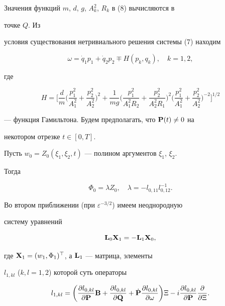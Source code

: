 Значения функций $m$, $d$, $g$, $A^2_k$, $R_k$ в (8) вычисляются в


точке $Q$. Из 


условия существования нетривиального решения системы (7) находим 


\begin{equation} 


\omega=\Dot q_1p_1+\Dot q_2p_2\mp H(p_k,q_k),\quad k=1,2, 


\end{equation} 


где 


$$ 


H=\biggl[\frac{d}{m}\biggl(\frac{p^2_1}{A^2_1}+ 


\frac{p^2_2}{A^2_2}\biggr)^2+\frac{1}{mg}\biggl( 


\frac{p^2_1}{A^2_1R_2}+\frac{p^2_2}{A^2_2R_1}\biggr)^2 


\biggl(\frac{p^2_1}{A^2_1}+\frac{p^2_2}{A^2_2}\biggr)^{-2} 


\biggr]^{1/2} 


$$ 


--- функция Гамильтона. Будем предполагать, что $\bold P(t)\ne 0$ на 


некотором отрезке $t\in[0,T]$. 


 


Пусть $w_0=Z_0(\xi_1,\xi_2,t)$ --- полином аргументов $\xi_1$, $\xi_2$. 


Тогда 


\begin{equation} 


\Phi_0=\lambda Z_0,\quad \lambda=-l_{0,11}l^{-1}_{0,12}. 


\end{equation} 


 


Во втором приближении (при $\varepsilon^{-3/2}$) имеем неоднородную 


систему уравнений 


\begin{equation} 


\BL_0\BX_1=-\BL_1\BX_0, 


\end{equation} 


где $\bold X_1=(w_1,\Phi_1)^\top$, а $\bold L_1$ --- матрица, элементы


$l_{1,kl}$ ($k,l=1,2$) которой суть операторы 


\begin{equation} 


l_{1,kl}=\biggl(\frac{\partial l_{0,kl}}{\partial \BP}\BB+ 


\frac{\partial l_{0,kl}}{\partial \BQ}+\Dot{\BP} 


\frac{\partial l_{0,kl}}{\partial\omega}\biggr)\Xi- 


i\frac{\partial l_{0,kl}}{\partial\BP} 


\frac{\partial}{\partial\Xi}. 


\end{equation} 


